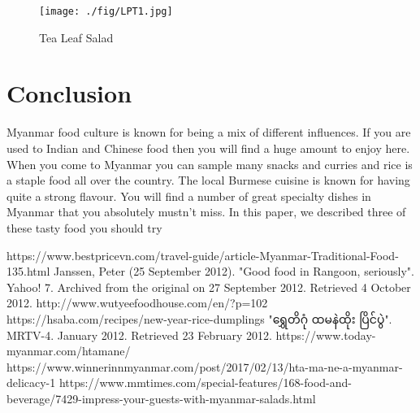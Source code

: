 \documentclass[conference]{IEEEtran}
\begin{document}
\begin{figure*}[ht!]
  \centering
\texttt{[image: ./fig/LPT1.jpg]}
  \caption{Tea Leaf Salad}
\label{fig:LPTFig3}
\end{figure*}

\section{Conclusion}
\label{sec:conclusion}

Myanmar food culture is known for being a mix of different influences. If you are used to Indian and Chinese food then you will find a huge amount to enjoy here. When you come to Myanmar you can sample many snacks and curries and rice is a staple food all over the country. The local Burmese cuisine is known for having quite a strong flavour. You will find a number of great specialty dishes in Myanmar that you absolutely mustn't miss. In this paper, we described three of these tasty food you should try   


\begin{thebibliography}{00}

 https://www.bestpricevn.com/travel-guide/article-Myanmar-Traditional-Food-135.html
 Janssen, Peter (25 September 2012). "Good food in Rangoon, seriously". Yahoo! 7. Archived from the original on 27 September 2012. Retrieved 4 October 2012.
 http://www.wutyeefoodhouse.com/en/?p=102
 https://hsaba.com/recipes/new-year-rice-dumplings
 "ရွှေတိဂုံ ထမနဲထိုး ပြိင်ပွဲ". MRTV-4. January 2012. Retrieved 23 February 2012.
 https://www.today-myanmar.com/htamane/ 
 https://www.winnerinnmyanmar.com/post/2017/02/13/hta-ma-ne-a-myanmar-delicacy-1
 https://www.mmtimes.com/special-features/168-food-and-beverage/7429-impress-your-guests-with-myanmar-salads.html
\end{thebibliography}
\end{document}
